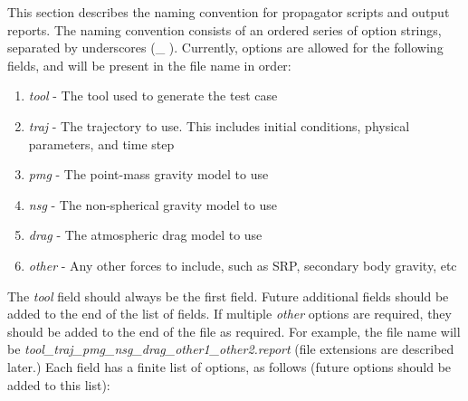 This section describes the naming convention for propagator scripts
and output reports. The naming convention consists of an ordered
series of option strings, separated by underscores (\_ ). Currently,
options are allowed for the following fields, and will be present in
the file name in order:
\begin{enumerate}
  \item \emph{tool} - The tool used to generate the test case
  \item \emph{traj} - The trajectory to use.  This includes initial conditions, physical parameters, and time step
  \item \emph{pmg} - The point-mass gravity model to use
  \item \emph{nsg} - The non-spherical gravity model to use
  \item \emph{drag} - The atmospheric drag model to use
  \item \emph{other} - Any other forces to include, such as SRP, secondary body gravity, etc
\end{enumerate}
The \emph{tool} field should always be the first field.  Future
additional fields should be added to the end of the list of fields.
If multiple \emph{other} options are required, they should be added
to the end of the file as required.  For example, the file name will
be \emph{tool\_traj\_pmg\_nsg\_drag\_other1\_other2.report} (file
extensions are described later.)  Each field has a finite list of
options, as follows (future options should be added to this list):
